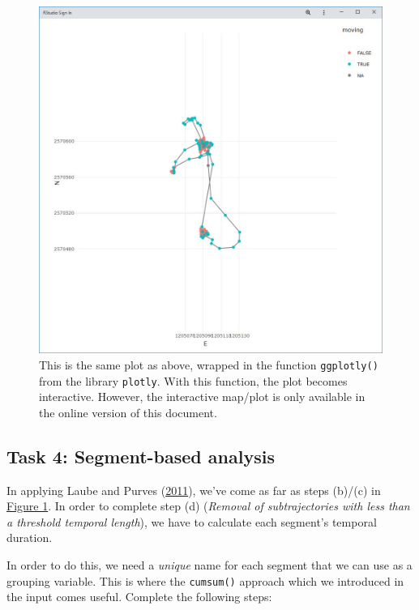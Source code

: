 \documentclass[]{book}
\begin{document}
\begin{figure}
\centering
\includegraphics{02_Images/w03_ex3_p1.jpg}
\caption{This is the same plot as above, wrapped in the function \texttt{ggplotly()} from the library \texttt{plotly}. With this function, the plot becomes interactive. However, the interactive map/plot is only available in the online version of this document.}
\end{figure}

\hypertarget{task-4-segment-based-analysis}{%
\subsection{Task 4: Segment-based analysis}\label{task-4-segment-based-analysis}}

In applying Laube and Purves (\protect\hyperlink{ref-laube2011}{2011}), we've come as far as steps (b)/(c) in \href{02_Images/laube_2011.jpg}{Figure 1}. In order to complete step (d) (\emph{Removal of subtrajectories with less than a threshold temporal length}), we have to calculate each segment's temporal duration.

In order to do this, we need a \emph{unique} name for each segment that we can use as a grouping variable. This is where the \texttt{cumsum()} approach which we introduced in the input comes useful. Complete the following steps:
\end{document}
